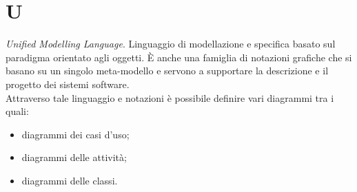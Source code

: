

\section{U}

\textit{Unified Modelling Language}. Linguaggio di modellazione e specifica basato sul paradigma orientato agli oggetti. È anche una famiglia di notazioni grafiche che si basano su un singolo meta-modello e servono a supportare la descrizione e il progetto dei sistemi software. \\
Attraverso tale linguaggio e notazioni è possibile definire vari diagrammi tra i quali:
\begin{itemize}
	\item diagrammi dei casi d’uso;
	\item diagrammi delle attività;
	\item diagrammi delle classi.
\end{itemize}
